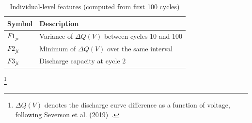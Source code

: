 \begin{table}[H]
\centering
\caption{Individual-level features (computed from first 100 cycles)}
\label{table:features}
\begin{tabular}{ll}
\toprule
Symbol & Description \\
\midrule
$F1_{ji}$ & Variance of $\Delta Q(V)$ between cycles 10 and 100 \\
$F2_{ji}$ & Minimum of $\Delta Q(V)$ over the same interval \\
$F3_{ji}$ & Discharge capacity at cycle 2 \\
\bottomrule
\end{tabular}
\end{table}
\footnote{$\Delta Q(V)$ denotes the discharge curve difference as a function of voltage, following Severson et al. (2019)~\cite{severson2019}.}

